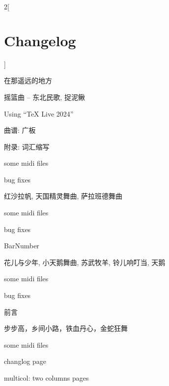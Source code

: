 {\begin{multicols*}{2}[\section*{Changelog}]
\begin{changelog}[author=李小丹, section=false]
\begin{version}[v=3.6-$\beta$(3.1415), date=2024-04-24]
	\added
		\item 在那遥远的地方
\end{version}
\begin{version}[v=3.5-$\beta$(3.1415), date=2024-04-03]
	\added
		\item 摇篮曲 -- 东北民歌, 捉泥鳅
	\changed
		\item Using ``TeX Live 2024''
\end{version}
\begin{version}[v=3.4-$\beta$(3.1415), date=2024-02-27]
	\added
		\item 曲谱: 广板
		\item 附录: 词汇缩写
		\item some midi files
	\fixed
		\item bug fixes
\end{version}
\begin{version}[v=3.3-$\beta$(3.1415), date=2024-02-07]
	\added
		\item 红沙拉帆, 天国精灵舞曲, 萨拉班德舞曲
		\item some midi files
	\fixed
		\item bug fixes
	\changed
		\item BarNumber
\end{version}
\begin{version}[v=3.2-$\beta$(3.1415), date=2024-01-04]
	\added
		\item 花儿与少年, 小天鹅舞曲, 苏武牧羊, 铃儿响叮当, 天鹅
		\item some midi files
	\fixed
		\item bug fixes
	\changed
		\item 前言
\end{version}
\begin{version}[v=3.1-$\beta$(3.1415), date=2023-12-28]
	\added
		\item 步步高，乡间小路，铁血丹心，金蛇狂舞
		\item some midi files
\end{version}
\begin{version}[v=3.0-$\beta$(3.1415), date=2023-12-22]
	\added
		\item changlog page
		\item multicol: two columns pages

\end{version}
\end{changelog}
\end{multicols*}}
